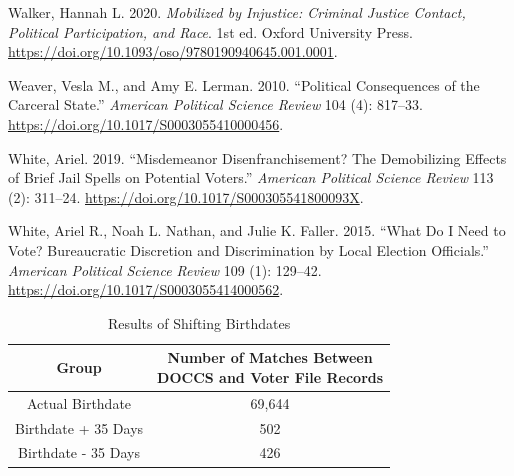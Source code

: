 \documentclass[
  12pt,
]{article}
\newlength{\cslhangindent}
\newenvironment{cslreferences}%
  {\setlength{\parindent}{0pt}%
  \everypar{\setlength{\hangindent}{\cslhangindent}}\ignorespaces}%
  {\par}
\begin{document}
\begin{cslreferences}
\leavevmode\hypertarget{ref-Walker2020a}{}%
Walker, Hannah L. 2020. \emph{Mobilized by Injustice: Criminal Justice Contact, Political Participation, and Race}. 1st ed. Oxford University Press. \url{https://doi.org/10.1093/oso/9780190940645.001.0001}.

\leavevmode\hypertarget{ref-Weaver2010}{}%
Weaver, Vesla M., and Amy E. Lerman. 2010. ``Political Consequences of the Carceral State.'' \emph{American Political Science Review} 104 (4): 817--33. \url{https://doi.org/10.1017/S0003055410000456}.

\leavevmode\hypertarget{ref-White2019}{}%
White, Ariel. 2019. ``Misdemeanor Disenfranchisement? The Demobilizing Effects of Brief Jail Spells on Potential Voters.'' \emph{American Political Science Review} 113 (2): 311--24. \url{https://doi.org/10.1017/S000305541800093X}.

\leavevmode\hypertarget{ref-White2015}{}%
White, Ariel R., Noah L. Nathan, and Julie K. Faller. 2015. ``What Do I Need to Vote? Bureaucratic Discretion and Discrimination by Local Election Officials.'' \emph{American Political Science Review} 109 (1): 129--42. \url{https://doi.org/10.1017/S0003055414000562}.
\end{cslreferences}

\newpage

\begin{singlespace}
\begin{table}[H]

\caption{\label{tab:shift-dobs-chunk}\label{tab:change-dobs} Results of Shifting Birthdates}
\centering
\begin{tabular}[t]{cc}
\toprule
Group & \makecell[l]{Number of Matches Between\\DOCCS and Voter File Records}\\
\midrule
Actual Birthdate & 69,644\\
Birthdate + 35 Days & 502\\
Birthdate - 35 Days & 426\\
\bottomrule
\end{tabular}
\end{table}










\end{singlespace}
\end{document}
